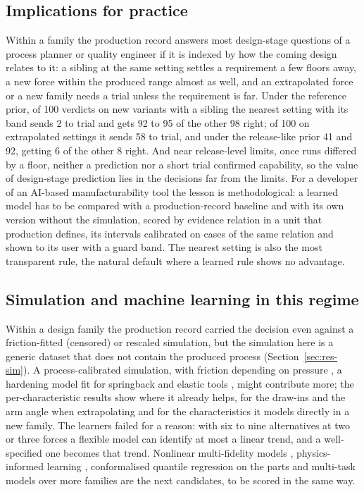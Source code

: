 \documentclass[pdflatex,sn-basic,lineno]{sn-jnl}
\begin{document}
\subsection{Implications for practice}

Within a family the production record answers most design-stage questions of a process planner or quality engineer if it is indexed by how the coming design relates to it: a sibling at the same setting settles a requirement a few floors away, a new force within the produced range almost as well, and an extrapolated force or a new family needs a trial unless the requirement is far. Under the reference prior, of 100 verdicts on new variants with a sibling the nearest setting with its band sends 2 to trial and gets 92 to 95 of the other 98 right; of 100 on extrapolated settings it sends 58 to trial, and under the release-like prior 41 and 92, getting 6 of the other 8 right. And near release-level limits, once runs differed by a floor, neither a prediction nor a short trial confirmed capability, so the value of design-stage prediction lies in the decisions far from the limits. For a developer of an AI-based manufacturability tool the lesson is methodological: a learned model has to be compared with a production-record baseline and with its own version without the simulation, scored by evidence relation in a unit that production defines, its intervals calibrated on cases of the same relation and shown to its user with a guard band. The nearest setting is also the most transparent rule, the natural default where a learned rule shows no advantage.

\subsection{Simulation and machine learning in this regime}

Within a design family the production record carried the decision even against a friction-fitted (censored) or rescaled simulation, but the simulation here is a generic dataset that does not contain the produced process (Section~\ref{sec:res-sim}). A process-calibrated simulation, with friction depending on pressure \citep{hol2012advanced}, a hardening model fit for springback \citep{wagoner2013advanced} and elastic tools \citep{pilthammar2018introduction}, might contribute more; the per-characteristic results show where it already helps, for the draw-ins and the arm angle when extrapolating and for the characteristics it models directly in a new family. The learners failed for a reason: with six to nine alternatives at two or three forces a flexible model can identify at most a linear trend, and a well-specified one becomes that trend. Nonlinear multi-fidelity models \citep{perdikaris2017nonlinear}, physics-informed learning \citep{karniadakis2021physics}, conformalised quantile regression on the parts \citep{romano2019conformalized} and multi-task models over more families \citep{bonilla2008multi} are the next candidates, to be scored in the same way.
\end{document}
